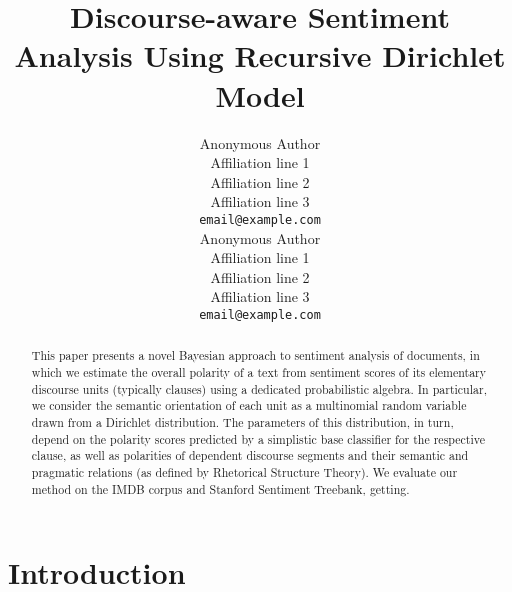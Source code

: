 \documentclass[11pt]{article}
\title{Discourse-aware Sentiment Analysis Using Recursive Dirichlet
  Model}
\author{Anonymous Author\\
  Affiliation line 1 \\
  Affiliation line 2 \\
  Affiliation line 3 \\
  {\tt email@example.com} \\\And{}
  Anonymous Author\\
  Affiliation line 1 \\
  Affiliation line 2 \\
  Affiliation line 3 \\
  {\tt email@example.com} \\}
\date{}
\newcommand{\ienocomma}{\textit{i.e.}}
\newcommand{\ie}{\ienocomma,}
\begin{document}
\maketitle
\begin{abstract}
  This paper presents a novel Bayesian approach to sentiment analysis
  of documents, in which we estimate the overall polarity of a text
  from sentiment scores of its elementary discourse units (typically
  clauses) using a dedicated probabilistic algebra.  In particular, we
  consider the semantic orientation of each unit as a multinomial
  random variable drawn from a Dirichlet distribution.  The parameters
  of this distribution, in turn, depend on the polarity scores
  predicted by a simplistic base classifier for the respective clause,
  as well as polarities of dependent discourse segments and their
  semantic and pragmatic relations (as defined by Rhetorical Structure
  Theory).  We evaluate our method on the IMDB corpus and Stanford
  Sentiment Treebank, getting.
\end{abstract}

\section{Introduction}\label{intro}


\end{document}
